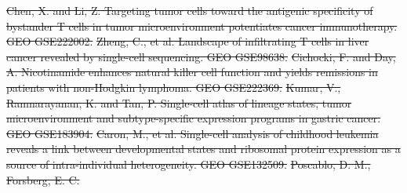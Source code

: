 \documentclass[referee, pdflatex, sn-vancouver-num]{sn-jnl}
\providecommand{\DIFdeltex}[1]{{\protect\color{red}\sout{#1}}}                      %
\providecommand{\DIFaddbegin}{} %
\providecommand{\DIFdelend}{} %
\providecommand{\DIFdel}[1]{\texorpdfstring{\DIFdeltex{#1}}{}} %
\newcommand{\DIFaddincludegraphics}[2][]{{\color{blue}\fbox{\DIFOincludegraphics[#1]{#2}}}} %
\DeclareRobustCommand{\DIFaddbegin}{\DIFOaddbegin \let\includegraphics\DIFaddincludegraphics} %
\DeclareRobustCommand{\DIFdelend}{\DIFOaddend \let\includegraphics\DIFOincludegraphics} %
\begin{document}
\begin{appendices}
\DIFdel{Chen, X. and Li, Z. Targeting tumor cells toward the antigenic specificity of bystander T cells in tumor microenvironment potentiates cancer immunotherapy. GEO GSE222002. }%
\DIFdel{Zheng, C., et al. Landscape of infiltrating T cells in liver cancer revealed by single-cell sequencing. GEO GSE98638. }%
\DIFdel{Cichocki, F. and Day, A. Nicotinamide enhances natural killer cell function and yields remissions in patients with non-Hodgkin lymphoma. GEO GSE222369. }%
\DIFdel{Kumar, V., Ramnarayanan, K. and Tan, P. Single-cell atlas of lineage states, tumor microenvironment and subtype-specific expression programs in gastric cancer. GEO GSE183904. }%
\DIFdel{Caron, M., et al. Single-cell analysis of childhood leukemia reveals a link between developmental states and ribosomal protein expression as a source of intra-individual heterogeneity. GEO GSE132509. }%
\DIFdel{Poscablo, D. M., Forsberg, E. C.}\DIFdelend %
\DIFaddbegin \renewcommand{\thefigure}{S\arabic{figure}}
\renewcommand{\thetable}{S\arabic{table}}
\setcounter{figure}{0}
\setcounter{table}{0}


\end{appendices}
\end{document}
